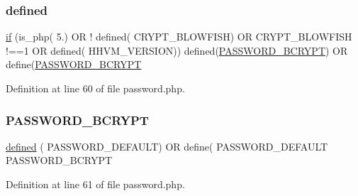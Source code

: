 \subsubsection{\texorpdfstring{defined}{defined}}
{\footnotesize\ttfamily \mbox{\hyperlink{_code_igniter_8php_a68ca62d45495d195f67d234bdafb1d1f}{if}} (is\+\_\+php( \textquotesingle{}5.\textquotesingle{}) OR ! defined( \textquotesingle{}C\+R\+Y\+P\+T\+\_\+\+B\+L\+O\+W\+F\+I\+SH\textquotesingle{}) OR C\+R\+Y\+P\+T\+\_\+\+B\+L\+O\+W\+F\+I\+SH !==1 OR defined( \textquotesingle{}H\+H\+V\+M\+\_\+\+V\+E\+R\+S\+I\+ON\textquotesingle{})) defined(\textquotesingle{}\mbox{\hyperlink{password_8php_a68891a3748e6362ed60dd2dc90d37576}{P\+A\+S\+S\+W\+O\+R\+D\+\_\+\+B\+C\+R\+Y\+PT}}\textquotesingle{}) OR define(\textquotesingle{}\mbox{\hyperlink{password_8php_a68891a3748e6362ed60dd2dc90d37576}{P\+A\+S\+S\+W\+O\+R\+D\+\_\+\+B\+C\+R\+Y\+PT}}\textquotesingle{}}



Definition at line 60 of file password.\+php.

\mbox{\label{password_8php_a68891a3748e6362ed60dd2dc90d37576}} 
\subsubsection{\texorpdfstring{PASSWORD\_BCRYPT}{PASSWORD\_BCRYPT}}
{\footnotesize\ttfamily \mbox{\hyperlink{password_8php_a74f41c0efe4435fb8ac2133464d3cd57}{defined}} ( \textquotesingle{}P\+A\+S\+S\+W\+O\+R\+D\+\_\+\+D\+E\+F\+A\+U\+LT\textquotesingle{}) OR define( \textquotesingle{}P\+A\+S\+S\+W\+O\+R\+D\+\_\+\+D\+E\+F\+A\+U\+LT\textquotesingle{} P\+A\+S\+S\+W\+O\+R\+D\+\_\+\+B\+C\+R\+Y\+PT}



Definition at line 61 of file password.\+php.


